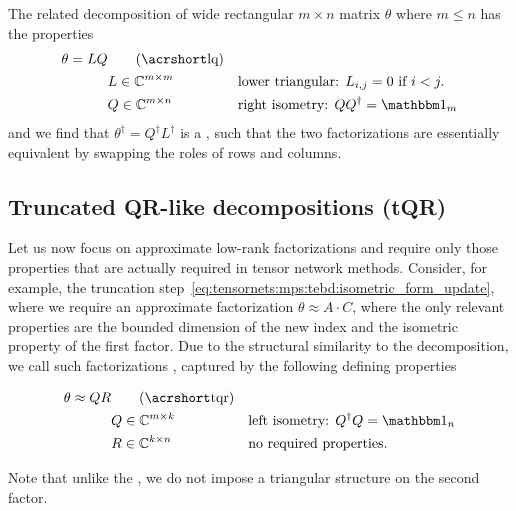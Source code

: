 The related  decomposition of wide rectangular $m \times n$ matrix $\theta$ where $m \leq n$ has the properties
\begin{equation}
\begin{aligned}
    \theta = L Q &\qquad \text{(\acroshort{lq})} &&
    \\
    &L \in \Cbb^{m \times m}  &&\text{lower triangular: } L_{i, j} = 0 \text{ if } i < j.
    \\
    &Q \in \Cbb^{m \times n}  &&\text{right isometry: } Q \hconj{Q} = \eye_m
\end{aligned}
\end{equation}
and we find that $\theta^\dagger = Q^\dagger L^\dagger$ is a , such that the two factorizations are essentially equivalent by swapping the roles of rows and columns.


\subsection{Truncated QR-like decompositions (tQR)}
\label{subsec:truncation:factorizations:tqr}

Let us now focus on approximate low-rank factorizations and require only those properties that are actually required in tensor network methods.
%
Consider, for example, the truncation step~\eqref{eq:tensornets:mps:tebd:isometric_form_update}, where we require an approximate factorization $\theta \approx A \cdot C$, where the only relevant properties are the bounded dimension of the new index and the isometric property of the first factor.
%
Due to the structural similarity to the  decomposition, we call such factorizations , captured by the following defining properties

\begin{equation}
\begin{aligned}
    \theta \approx Q R &\qquad \text{(\acroshort{tqr})} &&
    \\
    &Q \in \Cbb^{m \times k}  &&\text{left isometry: } \hconj{Q} Q = \eye_n
    \\
    &R \in \Cbb^{k \times n}  &&\text{no required properties}.
\end{aligned}
\end{equation}

Note that unlike the , we do not impose a triangular structure on the second factor.

